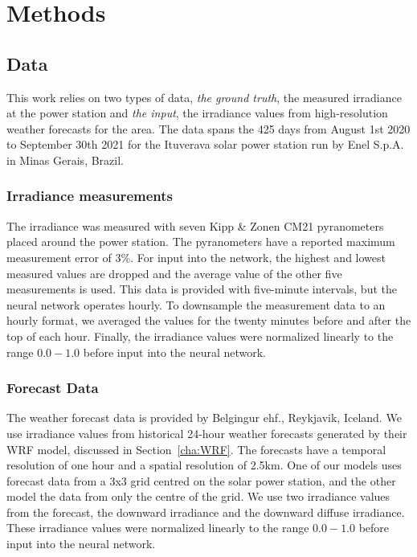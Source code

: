 \chapter{Methods}


\section{Data}
This work relies on two types of data, \emph{the ground truth}, the measured irradiance at the power station and \emph{the input}, the irradiance values from high-resolution weather forecasts for the area. The data spans the 425 days from August 1st 2020 to September 30th 2021 for the Ituverava solar power station run by Enel S.p.A. in Minas Gerais, Brazil.

\subsection{Irradiance measurements}
The irradiance was measured with seven Kipp \& Zonen CM21 pyranometers placed around the power station. The pyranometers have a reported maximum measurement error of 3\%. For input into the network, the highest and lowest measured values are dropped and the average value of the other five measurements is used. This data is provided with five-minute intervals, but the neural network operates hourly. To downsample the measurement data to an hourly format, we averaged the values for the twenty minutes before and after the top of each hour. Finally, the irradiance values were normalized linearly to the range $0.0-1.0$ before input into the neural network.


\subsection{Forecast Data\label{cha:forecast_data}}
The weather forecast data is provided by Belgingur ehf., Reykjavik, Iceland. We use irradiance values from historical 24-hour weather forecasts generated by their WRF model, discussed in Section~\ref{cha:WRF}. The forecasts have a temporal resolution of one hour and a spatial resolution of 2.5km. One of our models uses forecast data from a 3x3 grid centred on the solar power station, and the other model the data from only the centre of the grid. We use two irradiance values from the forecast, the downward irradiance and the downward diffuse irradiance. These irradiance values were normalized linearly to the range $0.0-1.0$ before input into the neural network.


